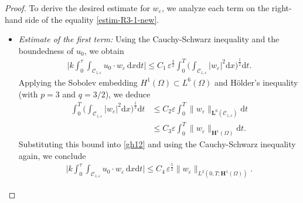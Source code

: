 \documentclass[a4paper,12pt,reqno,natbib]{amsart}
\newcommand{\dx} {\displaystyle\mathrm{d}x}
\newcommand{\dt} {\displaystyle\mathrm{d}t}
\def\H{\textbf{H}}
\def\L{\textbf{L}}
\begin{document}
\begin{proof}
\noindent To derive the desired estimate for \(w_\varepsilon\), we analyze each term on the right-hand side of the equality \eqref{estim-R3-1-new}. 

\begin{itemize}
    \item[$-$] \emph{Estimate of the first term:}  
    Using the Cauchy-Schwarz inequality and the boundedness of \( u_0 \), we obtain  
    \begin{align}\label{gh12}
        \big| k \int_0^{\tau} \int_{\mathcal{C}_{z,\varepsilon}} u_0 \cdot w_\varepsilon \, \dx\dt \big|  
        \leq C_1\,\varepsilon^{\frac{3}{2}} \int_0^T \big(\int_{\mathcal{C}_{z,\varepsilon}} \big|w_\varepsilon\big|^2 \dx \big)^{\frac{1}{2}} \dt.
    \end{align}
    Applying the Sobolev embedding \( H^1(\Omega) \subset L^6(\Omega) \) and H\"older's inequality (with \( p=3 \) and \( q=3/2 \)), we deduce  
    \begin{align*}
        \int_0^T \big(\int_{\mathcal{C}_{z,\varepsilon}} \big|w_\varepsilon\big|^2 \dx \big)^{\frac{1}{2}} \dt  
        &\leq C_2 \varepsilon \int_0^T \big\| w_\varepsilon \big\|_{\L^6(\mathcal{C}_{z,\varepsilon})} \dt \\  
        &\leq C_3 \varepsilon \int_0^T \big\| w_\varepsilon \big\|_{\H^1(\Omega)} \dt.
    \end{align*}
    Substituting this bound into \eqref{gh12} and using the Cauchy-Schwarz inequality again, we conclude  
    \begin{align}\label{gh12f1}
        \big| k \int_0^{\tau} \int_{\mathcal{C}_{z,\varepsilon}} u_0 \cdot w_\varepsilon \, \dx\dt \big|  
        \leq C_4\,\varepsilon^{\frac{5}{2}} \big\|w_\varepsilon\big\|_{L^2(0,T;\H^1(\Omega))}.
    \end{align}


\end{itemize}
\end{proof}
\end{document}
